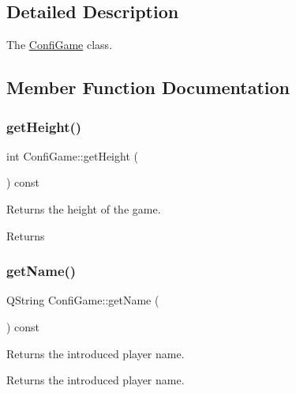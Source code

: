 \subsection{Detailed Description}
The \hyperlink{class_confi_game}{Confi\+Game} class. 

\subsection{Member Function Documentation}
\mbox{\label{class_confi_game_a00c3fbb4b7eac1ef88ccb78d2b7e6340}} 
\subsubsection{\texorpdfstring{get\+Height()}{getHeight()}}
{\footnotesize\ttfamily int Confi\+Game\+::get\+Height (\begin{DoxyParamCaption}{ }\end{DoxyParamCaption}) const}



Returns the height of the game. 

\begin{DoxyReturn}{Returns}

\end{DoxyReturn}
\mbox{\label{class_confi_game_ad9c654732a5eb1871775f2c55e5cb7ed}} 
\subsubsection{\texorpdfstring{get\+Name()}{getName()}}
{\footnotesize\ttfamily Q\+String Confi\+Game\+::get\+Name (\begin{DoxyParamCaption}{ }\end{DoxyParamCaption}) const}



Returns the introduced player name. 

\begin{DoxyReturn}{Returns}
the introduced player name. 
\end{DoxyReturn}
\mbox{\label{class_confi_game_a346b36c4a1a7016414dbac08ac401c8e}} 
